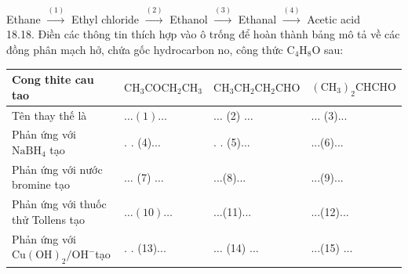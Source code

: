 \documentclass[10pt]{article}
\begin{document}
Ethane $\xrightarrow{(1)}$ Ethyl chloride $\xrightarrow{(2)}$ Ethanol $\xrightarrow{(3)}$ Ethanal $\xrightarrow{(4)}$ Acetic acid\\
18.18. Điền các thông tin thích hợp vào ô trống để hoàn thành bảng mô tả về các đồng phân mạch hở, chứa gốc hydrocarbon no, công thức $\mathrm{C}_{4} \mathrm{H}_{8} \mathrm{O}$ sau:

\begin{center}
\begin{tabular}{|l|l|l|l|}
\hline
Cong thite cau tao & $\mathrm{CH}_{3} \mathrm{COCH}_{2} \mathrm{CH}_{3}$ & $\mathrm{CH}_{3} \mathrm{CH}_{2} \mathrm{CH}_{2} \mathrm{CHO}$ & $\left(\mathrm{CH}_{3}\right)_{2} \mathrm{CHCHO}$ \\
\hline
Tên thay thế là & $\ldots(1) \ldots$ & $\ldots$ (2) $\ldots$ & $\ldots$ (3)... \\
\hline
Phản ứng với $\mathrm{NaBH}_{4}$ tạo & . . (4)... & . . (5)... & ...(6)... \\
\hline
Phản ứng với nước bromine tạo & $\ldots$ (7) $\ldots$ & ...(8)... & ...(9)... \\
\hline
Phản ứng với thuốc thử Tollens tạo & $\ldots(10) \ldots$ & ...(11)... & ...(12)... \\
\hline
Phản ứng với $\mathrm{Cu}(\mathrm{OH})_{2} / \mathrm{OH}^{-}$tạo & . . (13)... & $\ldots$ (14) $\ldots$ & ...(15) ... \\
\hline
\end{tabular}
\end{center}
\end{document}

